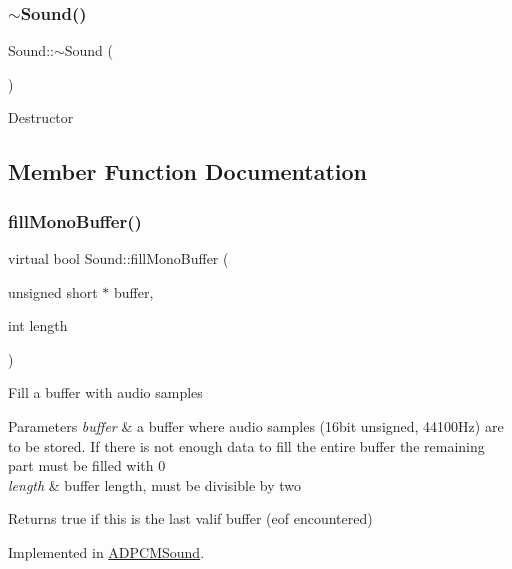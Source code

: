 \subsubsection{\texorpdfstring{$\sim$\+Sound()}{~Sound()}}
{\footnotesize\ttfamily Sound\+::$\sim$\+Sound (\begin{DoxyParamCaption}{ }\end{DoxyParamCaption})\hspace{0.3cm}{\ttfamily [virtual]}}

Destructor 

\subsection{Member Function Documentation}
\mbox{\label{class_sound_aa0068675e952893d2fdfef2503bcbc81}} 
\subsubsection{\texorpdfstring{fill\+Mono\+Buffer()}{fillMonoBuffer()}}
{\footnotesize\ttfamily virtual bool Sound\+::fill\+Mono\+Buffer (\begin{DoxyParamCaption}\item[{unsigned short $\ast$}]{buffer,  }\item[{int}]{length }\end{DoxyParamCaption})\hspace{0.3cm}{\ttfamily [pure virtual]}}

Fill a buffer with audio samples 
\begin{DoxyParams}{Parameters}
{\em buffer} & a buffer where audio samples (16bit unsigned, 44100\+Hz) are to be stored. If there is not enough data to fill the entire buffer the remaining part must be filled with 0 \\
\hline
{\em length} & buffer length, must be divisible by two \\
\hline
\end{DoxyParams}
\begin{DoxyReturn}{Returns}
true if this is the last valif buffer (eof encountered) 
\end{DoxyReturn}


Implemented in \hyperlink{class_a_d_p_c_m_sound_aa4bae7530240f47b76abef5dee718649}{A\+D\+P\+C\+M\+Sound}.

\mbox{\label{class_sound_ac514e0aa8963b40ddd328a9f79d0769b}} 

